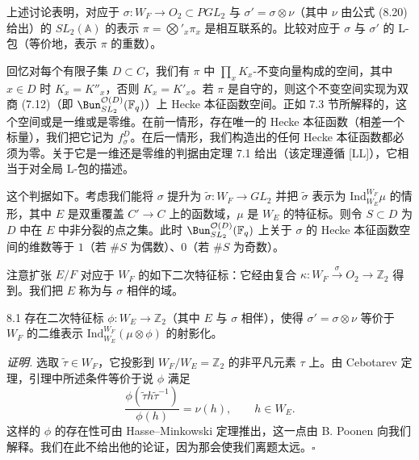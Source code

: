 上述讨论表明，对应于 $\sigma : W_F \to O_2\subset PGL_2$ 与 $\sigma' = \sigma\otimes\nu$（其中 $\nu$ 由公式 (8.20) 给出）的 $SL_2(\mathbb{A})$ 的表示 $\pi = \bigotimes'_x \pi_x$ 是相互联系的。比较对应于 $\sigma$ 与 $\sigma'$ 的 L-包（等价地，表示 $\pi$ 的重数）。

回忆对每个有限子集 $D\subset C$，我们有 $\pi$ 中 $\prod_x K_x$-不变向量构成的空间，其中 $x\in D$ 时 $K_x = K''_x$，否则 $K_x = K'_x$。若 $\pi$ 是自守的，则这个不变空间实现为双商 (7.12)（即 $\Bun^{\mathcal{O}(D)}_{SL_2}(\mathbb{F}_q)$）上 Hecke 本征函数空间。正如 7.3 节所解释的，这个空间或是一维或是零维。在前一情形，存在唯一的 Hecke 本征函数（相差一个标量），我们把它记为 $f^D_\sigma$。在后一情形，我们构造出的任何 Hecke 本征函数都必须为零。关于它是一维还是零维的判据由定理 7.1 给出（该定理遵循 [LL]），它相当于对全局 L-包的描述。


这个判据如下。考虑我们能将 $\sigma$ 提升为 $\tilde{\sigma} : W_F \to GL_2$ 并把 $\tilde{\sigma}$ 表示为 $\mathrm{Ind}_{W_E}^{W_F}\mu$ 的情形，其中 $E$ 是双重覆盖 $C'\to C$ 上的函数域，$\mu$ 是 $W_E$ 的特征标。则令 $S\subset D$ 为 $D$ 中在 $E$ 中非分裂的点之集。此时 $\Bun^{\mathcal{O}(D)}_{SL_2}(\mathbb{F}_q)$ 上关于 $\sigma$ 的 Hecke 本征函数空间的维数等于 $1$（若 $\#S$ 为偶数）、$0$（若 $\#S$ 为奇数）。

注意扩张 $E/F$ 对应于 $W_F$ 的如下二次特征标：它经由复合 $\kappa : W_F \xrightarrow{\ \sigma\ } O_2 \to \mathbb{Z}_2$ 得到。我们把 $E$ 称为与 $\sigma$ 相伴的域。

\begin{namedlemma}{8.1}
存在二次特征标 $\phi : W_E \to \mathbb{Z}_2$（其中 $E$ 与 $\sigma$ 相伴），使得 $\sigma' = \sigma\otimes\nu$ 等价于 $W_F$ 的二维表示 $\mathrm{Ind}_{W_E}^{W_F}(\mu\otimes\phi)$ 的射影化。
\end{namedlemma}

\textit{证明.} 选取 $\tilde{\tau}\in W_F$，它投影到 $W_F/W_E = \mathbb{Z}_2$ 的非平凡元素 $\tau$ 上。由 Cebotarev 定理，引理中所述条件等价于说 $\phi$ 满足
\[
\frac{\phi(\tilde{\tau}h\tilde{\tau}^{-1})}{\phi(h)} = \nu(h), \qquad h\in W_E.
\]
这样的 $\phi$ 的存在性可由 Hasse--Minkowski 定理推出，这一点由 B. Poonen 向我们解释。我们在此不给出他的论证，因为那会使我们离题太远。\hfill$\square$

